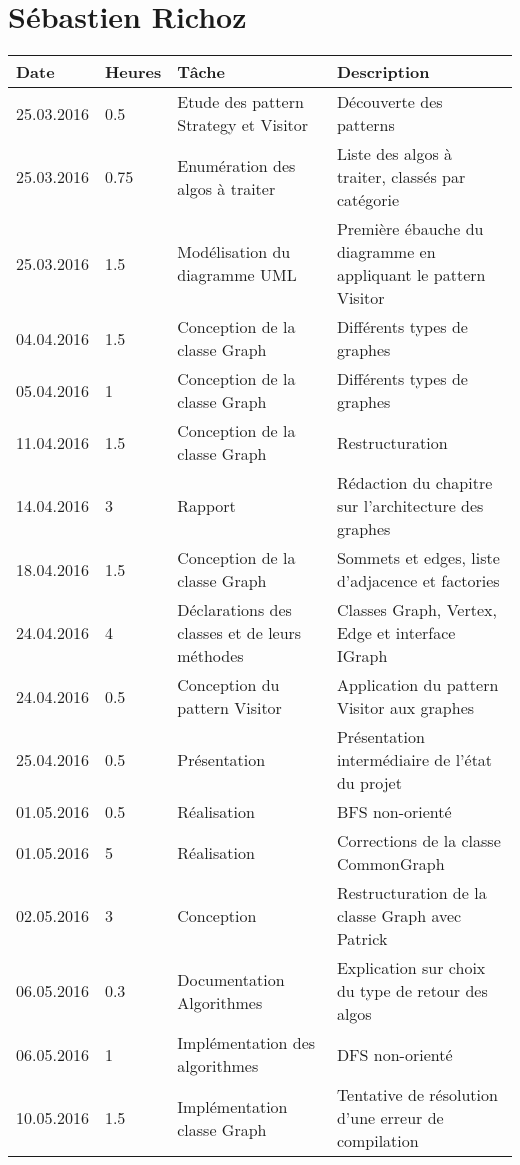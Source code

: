\documentclass[french]{article}
\begin{document}
	\section*{Sébastien Richoz}
	\begin{longtable}{p{}|p{}|p{}|p{}}
		Date&Heures&Tâche&Description\\
		\hline \hline
		25.03.2016 & 0.5 &Etude des pattern Strategy et Visitor&Découverte des patterns\\
		25.03.2016 & 0.75&Enumération des algos à traiter&Liste des algos à traiter, classés par catégorie\\
		25.03.2016 & 1.5 &Modélisation du diagramme UML&Première ébauche du diagramme en appliquant le pattern Visitor\\
		\hline
		04.04.2016 & 1.5 &Conception de la classe Graph&Différents types de graphes\\
		05.04.2016 & 1   &Conception de la classe Graph&Différents types de graphes\\
		\hline
		11.04.2016 & 1.5 &Conception de la classe Graph&Restructuration\\
		\hline
		14.04.2016 & 3   &Rapport&Rédaction du chapitre sur l'architecture des graphes\\
		\hline
		18.04.2016 & 1.5&Conception de la classe Graph&Sommets et edges, liste d'adjacence et factories\\
		24.04.2016 & 4   &Déclarations des classes et de leurs méthodes&Classes Graph, Vertex, Edge et interface IGraph\\
		24.04.2016 & 0.5&Conception du pattern Visitor&Application du pattern Visitor aux graphes\\
		\hline
		25.04.2016 & 0.5 & Présentation & Présentation intermédiaire de l'état du projet\\
		01.05.2016 & 0.5 & Réalisation & BFS non-orienté\\
		01.05.2016 & 5 & Réalisation & Corrections de la classe CommonGraph\\
		\hline
		02.05.2016 & 3 & Conception & Restructuration de la classe Graph avec Patrick\\
		06.05.2016 & 0.3 & Documentation Algorithmes & Explication sur choix du type de retour des algos\\
		06.05.2016 & 1 & Implémentation des algorithmes & DFS non-orienté\\
		\hline
		10.05.2016 & 1.5 & Implémentation classe Graph & Tentative de résolution d'une erreur de compilation\\

\end{longtable}
\end{document}
